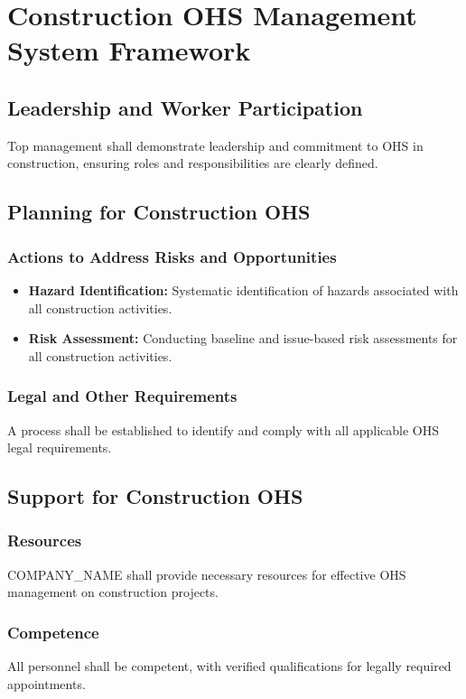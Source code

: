 \documentclass[12pt]{article}
\begin{document}
\section{Construction OHS Management System Framework}

\subsection{Leadership and Worker Participation}
Top management shall demonstrate leadership and commitment to OHS in construction, ensuring roles and responsibilities are clearly defined.

\subsection{Planning for Construction OHS}

\subsubsection{Actions to Address Risks and Opportunities}
\begin{itemize}
    \item \textbf{Hazard Identification:} Systematic identification of hazards associated with all construction activities.
    \item \textbf{Risk Assessment:} Conducting baseline and issue-based risk assessments for all construction activities.
\end{itemize}

\subsubsection{Legal and Other Requirements}
A process shall be established to identify and comply with all applicable OHS legal requirements.

\subsection{Support for Construction OHS}

\subsubsection{Resources}
{{COMPANY_NAME}} shall provide necessary resources for effective OHS management on construction projects.

\subsubsection{Competence}
All personnel shall be competent, with verified qualifications for legally required appointments.
\end{document}
